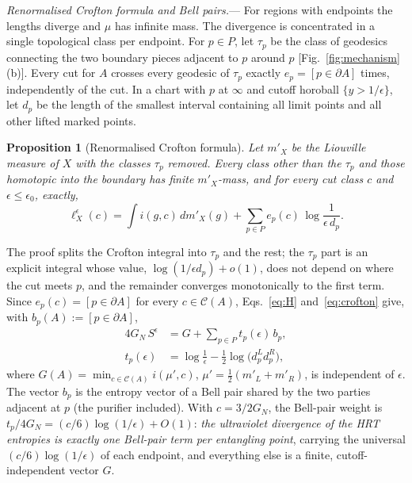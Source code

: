 \documentclass[aps,prl,twocolumn,superscriptaddress,nofootinbib,amsmath,amssymb]{revtex4-2}
\newtheorem{proposition}{Proposition}
\theoremstyle{definition}
\newcommand{\Cut}{\mathcal{C}}
\newcommand{\eps}{\epsilon}
\begin{document}
\emph{Renormalised Crofton formula and Bell pairs.}---%
For regions with endpoints the lengths diverge and $\mu$ has infinite mass. The divergence is concentrated in
a single topological class per endpoint. For $p\in P$, let $\tau_p$ be the class of geodesics connecting the
two boundary pieces adjacent to $p$ around $p$ [Fig.~\ref{fig:mechanism}(b)]. Every cut for $A$ crosses
every geodesic of $\tau_p$ exactly $e_p=[p\in\partial A]$ times, independently of the cut. In a chart with $p$ at
$\infty$ and cutoff horoball $\{y>1/\eps\}$, let $d_p$ be the length of the smallest interval containing all
limit points and all other lifted marked points.

\begin{proposition}[Renormalised Crofton formula]\label{prop:crofton}
Let $m'_X$ be the Liouville measure of $X$ with the classes $\tau_p$ removed. Every class other than the
$\tau_p$ and those homotopic into the boundary has finite $m'_X$-mass, and for every cut class $c$ and
$\eps\le\eps_0$, exactly,
\begin{equation}\label{eq:crofton}
\ell^\eps_X(c)=\int i(g,c)\,dm'_X(g)+\sum_{p\in P}e_p(c)\,\log\frac{1}{\eps\,d_p}.
\end{equation}
\end{proposition}

The proof splits the Crofton integral into $\tau_p$ and the rest; the $\tau_p$ part is an explicit integral
whose value, $\log(1/\eps d_p)+o(1)$, does not depend on where the cut meets $p$, and the remainder converges
monotonically to the first term. Since $e_p(c)=[p\in\partial A]$ for every $c\in\Cut(A)$, Eqs.~\eqref{eq:H}
and~\eqref{eq:crofton} give, with $b_p(A):=[p\in\partial A]$,
\begin{equation}\label{eq:decomp}
\begin{aligned}
4G_N\,S^\eps&=G+\sum_{p\in P}t_p(\eps)\,b_p,\\
t_p(\eps)&=\log\frac1\eps-\frac12\log\big(d_p^Ld_p^R\big),
\end{aligned}
\end{equation}
where $G(A)=\min_{c\in\Cut(A)}i(\mu',c)$, $\mu'=\frac12(m'_L+m'_R)$, is independent of $\eps$. The vector $b_p$ is
the entropy vector of a Bell pair shared by the two parties adjacent at $p$ (the purifier included). With
$c=3/2G_N$, the Bell-pair weight is $t_p/4G_N=(c/6)\log(1/\eps)+O(1)$: \emph{the ultraviolet divergence of the HRT
entropies is exactly one Bell-pair term per entangling point}, carrying the universal $(c/6)\log(1/\eps)$ of
each endpoint, and everything else is a finite, cutoff-independent vector $G$.
\end{document}
